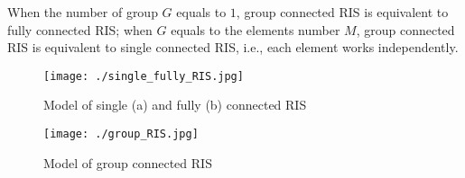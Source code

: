 When the number of group $G$ equals to $1$, group connected RIS is equivalent to fully connected RIS; when 
$G$ equals to the elements number $M$, group connected RIS is equivalent to single connected RIS, i.e., each element works independently.

\begin{figure}[htbp]
    \centering
    \texttt{[image: ./single\_fully\_RIS.jpg]}
    \caption{Model of single (a) and fully (b) connected RIS \cite{shen2020modeling}}
    \label{fig:single_fully_RIS}
\end{figure}

\begin{figure}[htbp]
    \centering
    \texttt{[image: ./group\_RIS.jpg]}
    \caption{Model of group connected RIS\cite{shen2020modeling}}
    \label{fig:group_RIS}
\end{figure}